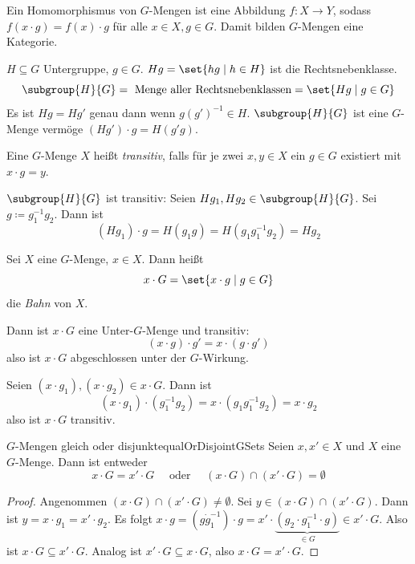 \documentclass[language=ngerman]{TemplateLecture} %
\begin{document}
Ein Homomorphismus von \(G\)-Mengen ist eine Abbildung \(f \colon X \to Y\), sodass \(f(x \cdot g) = f(x) \cdot g\) für alle \(x \in X, g\in G\). Damit bilden \(G\)-Mengen eine Kategorie.

\begin{example}
    \(H\subseteq G\) Untergruppe, \(g \in G\).
    \(Hg = \set{hg \mid h\in H}\) ist die Rechtsnebenklasse.
    \[\subgroup{H}{G} = \text{ Menge aller Rechtsnebenklassen} = \set{Hg \mid g \in G}\]
    Es ist \(Hg = Hg'\) genau dann wenn \(g(g')^{-1} \in H\). \(\subgroup{H}{G}\) ist eine \(G\)-Menge vermöge \((Hg') \cdot g = H(g'g)\).
\end{example}

Eine \(G\)-Menge \(X\) heißt \emph{transitiv}, falls für je zwei \(x,y \in X\) ein \(g \in G\) existiert mit \(x \cdot g = y\).

\begin{example}
    \(\subgroup{H}{G}\) ist transitiv: Seien \(Hg_1, Hg_2 \in \subgroup{H}{G}\). Sei \(g\coloneq g_1^{-1}g_2\). Dann ist
    \[(Hg_1)\cdot g = H(g_1 g) = H(g_1 g_1^{-1}g_2) = Hg_2\]
\end{example}

Sei \(X\) eine \(G\)-Menge, \(x \in X\). Dann heißt
\[x \cdot G = \set{x\cdot g \mid g \in G}\]
die \emph{Bahn} von \(X\).

Dann ist \(x\cdot G\) eine Unter-\(G\)-Menge und transitiv:
\[(x\cdot g) \cdot g' = x \cdot (g \cdot g')\]
also ist \(x\cdot G\) abgeschlossen unter der \(G\)-Wirkung.

Seien \((x\cdot g_1), (x\cdot g_2) \in x \cdot G\). Dann ist
\[(x\cdot g_1) \cdot (g_1^{-1}g_2) = x\cdot (g_1 g_1^{-1}g_2) = x\cdot g_2\]
also ist \(x \cdot G\) transitiv.

\begin{lem}{$G$-Mengen gleich oder disjunkt}{equalOrDisjointGSets}
    Seien \(x, x' \in X\) und \(X\) eine \(G\)-Menge. Dann ist entweder
    \[x\cdot G = x' \cdot G \quad \text{ oder } \quad (x\cdot G) \cap (x' \cdot G) = \emptyset\]
\end{lem}

\begin{proof}
    Angenommen \((x\cdot G) \cap (x'\cdot G) \neq \emptyset\). Sei \(y \in (x\cdot G) \cap (x' \cdot G)\). Dann ist \(y = x \cdot g_1 = x' \cdot g_2\). Es folgt \(x \cdot g = (g \dot g_1^{-1}) \cdot g = x' \cdot \underbrace{(g_2\cdot g_1^{-1} \cdot g)}_{\in G} \in x' \cdot G\). Also ist \(x \cdot G \subseteq x' \cdot G\). Analog ist \(x' \cdot G \subseteq x \cdot G\), also \(x \cdot G = x' \cdot G\).
\end{proof}
\end{document}
